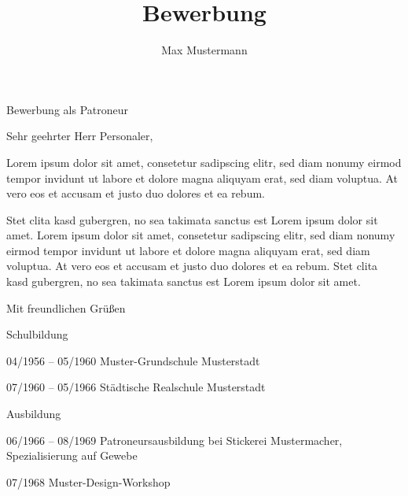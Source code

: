 \documentclass[german]{alpication}
\author{Max Mustermann}
\title{Bewerbung}
\begin{document}

\begin{correspondance}{Bewerbung als Patroneur}
	\opening{Sehr geehrter Herr Personaler,}

	Lorem ipsum dolor sit amet, consetetur sadipscing elitr, sed diam nonumy eirmod tempor invidunt ut labore
	et dolore magna aliquyam erat, sed diam voluptua. At vero eos et accusam et justo duo dolores et ea rebum.
	
	Stet clita kasd gubergren, no sea takimata sanctus est Lorem ipsum dolor sit amet. Lorem ipsum dolor sit amet,
	consetetur sadipscing elitr, sed diam nonumy eirmod tempor invidunt ut labore et dolore magna aliquyam erat,
	sed diam voluptua. At vero eos et accusam et justo duo dolores et ea rebum. Stet clita kasd gubergren, no sea
	takimata sanctus est Lorem ipsum dolor sit amet.

	\closing{Mit freundlichen Grüßen}
\end{correspondance}

	

\begin{curriculumvitae}
	\begin{cvsection}{Schulbildung}
		\item [04/1956 -- 05/1960] 	Muster-Grundschule Musterstadt
		\item [07/1960 -- 05/1966] 	Städtische Realschule Musterstadt
	\end{cvsection}

	\begin{cvsection}{Ausbildung}
		\item [06/1966 -- 08/1969] 	Patroneursausbildung bei Stickerei Mustermacher, Spezialisierung auf Gewebe
		\item [07/1968]			Muster-Design-Workshop
	\end{cvsection}
\end{curriculumvitae}
\end{document}
